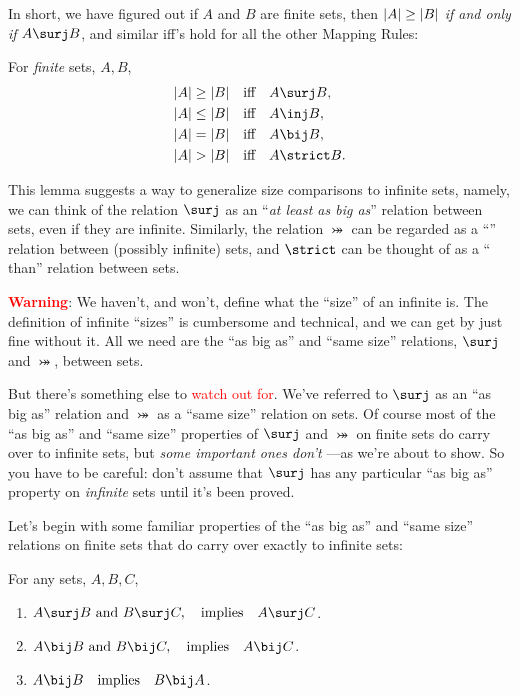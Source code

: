 In short, we have figured out if $A$ and $B$ are finite sets, then
$\left|A\right| \geq \left|B\right|$ \emph{if and only if} $A \surj B$, and similar
iff's hold for all the other Mapping Rules:
\begin{lemma}\label{finbig}
For \emph{finite} sets, $A,B$,
\begin{align*}
\card{A} \geq \card{B} & \qiff A \surj B,\\
\card{A} \leq \card{B} & \qiff A \inj B,\\
\card{A} = \card{B} & \qiff A \bij B,\\
\card{A} > \card{B} & \qiff A \strict B.
\end{align*}
\end{lemma}

This lemma suggests a way to generalize size comparisons to infinite sets,
namely, we can think of the relation $\surj$ as an ``\emph{at least as big
  as}'' relation between sets, even if they are infinite.  Similarly, the
relation $\bij$ can be regarded as a ``'' relation between
(possibly infinite) sets, and $\strict$ can be thought of as a
`` than'' relation between sets.

\textcolor{red}{\textbf{Warning}}: We haven't, and won't, define what the
``size'' of an infinite is.  The definition of infinite ``sizes'' is
cumbersome and technical, and we can get by just fine without it.  All we
need are the ``as big as'' and ``same size'' relations, $\surj$ and
$\bij$, between sets.

But there's something else to \textcolor{red}{watch out for}.  We've
referred to $\surj$ as an ``as big as'' relation and $\bij$ as a ``same
size'' relation on sets.  Of course most of the ``as big as'' and ``same
size'' properties of $\surj$ and $\bij$ on finite sets do carry over to
infinite sets, but \emph{some important ones don't} ---as we're about to
show.  So you have to be careful: don't assume that $\surj$ has any
particular ``as big as'' property on \emph{infinite} sets until it's been
proved.

Let's begin with some familiar properties of the ``as big as'' and ``same
size'' relations on finite sets that do carry over exactly to infinite
sets:
\begin{lemma}\label{translem}
For any sets, $A,B,C$,
\begin{enumerate}

\item \label{bigtrans}
$A \surj  B \text{ and } B \surj C, \qimplies  A \surj C$.

\item \label{sametrans} $A \bij B \text{ and } B \bij C, \qimplies A \bij C$.

\item\label{sameABA}
$A \bij B \qimplies B \bij A$.
\end{enumerate}
\end{lemma}

